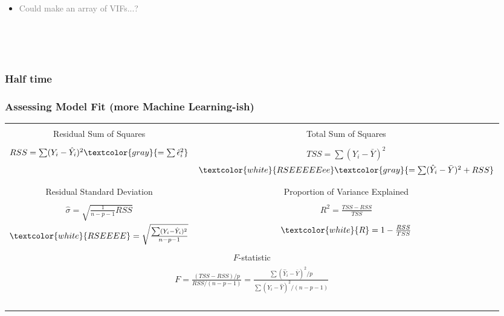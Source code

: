 \documentclass[xcolor={dvipsnames}]{beamer}
\begin{document}
{\begin{itemize}
\item<5->[] \textcolor{gray}{Could make an array of VIFs...?}

\end{itemize}


\footnotesize
${}$\\
${}$\\
\\


}


\frame
{
 \frametitle{Half time}
}











\frame
{
\frametitle{Assessing Model Fit \textbf{(more Machine Learning-ish)}}


\begin{table}[h!]
\centering
\begin{tabular}{|c|c|}
\hline
&\\
 Residual Sum of Squares  & Total Sum of Squares  \\
&\\
$RSS = \sum(Y_i - \hat Y_i)^2 \textcolor{gray}{= \sum \hat \epsilon_i^2}$ & $TSS = \sum(Y_i - \bar Y)^2 $ \\
 & $\textcolor{white}{RSEEEEEee}  \textcolor{gray}{= \sum( \hat Y_i - \bar Y )^2 + RSS}$ \\
&\\ \hline
&\\
Residual Standard Deviation & Proportion of Variance Explained\\
&\\
$\hat \sigma = \sqrt{\frac{1}{n-p-1}RSS}$ & $R^2 = \frac{TSS - RSS}{TSS}$ \\
$\textcolor{white}{RSEEEE} = \sqrt{\frac{\sum(Y_i - \hat Y_i)^2}{n-p-1}}$ &$\textcolor{white}{R} = 1-\frac{RSS}{TSS}$\\
&\\ \hline
\multicolumn{2}{|c|}{$F$-statistic}\\
\multicolumn{2}{|c|}{$F =  \frac{(TSS - RSS)/p}{RSS/(n-p-1)} = \frac{\sum(\hat Y_i -\bar Y )^2/p}{\sum( Y_i -\hat Y )^2/(n-p-1)}$}\\ 
\multicolumn{2}{|c|}{${}$}\\\hline
\end{tabular}
\end{table}

}
\end{document}
